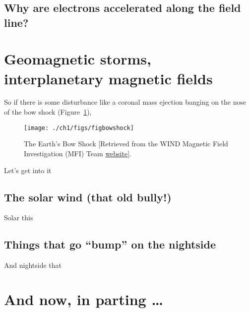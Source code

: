\subsection{Why are electrons accelerated along the field line?}



\section{Geomagnetic storms, interplanetary magnetic fields}

So if there is some disturbance like a coronal mass ejection banging
on the nose of the bow shock (Figure~\ref{ch1:FigBowShock}),


\begin{figure}
  \centering
  \noindent\texttt{[image: ./ch1/figs/figbowshock]}
  \caption[The Earth's Bow Shock]{The Earth's Bow Shock [Retrieved
    from the WIND Magnetic Field Investigation (MFI) Team
    \href{https://wind.nasa.gov/mfi/team_sciencea.html}{website}].}
  \label{ch1:FigBowShock}
\end{figure}




Let's get into it

\subsection{The solar wind (that old bully!)}

Solar this 

\subsection{Things that go ``bump'' on the nightside}

And nightside that 

\section{And now, in parting \dots}




